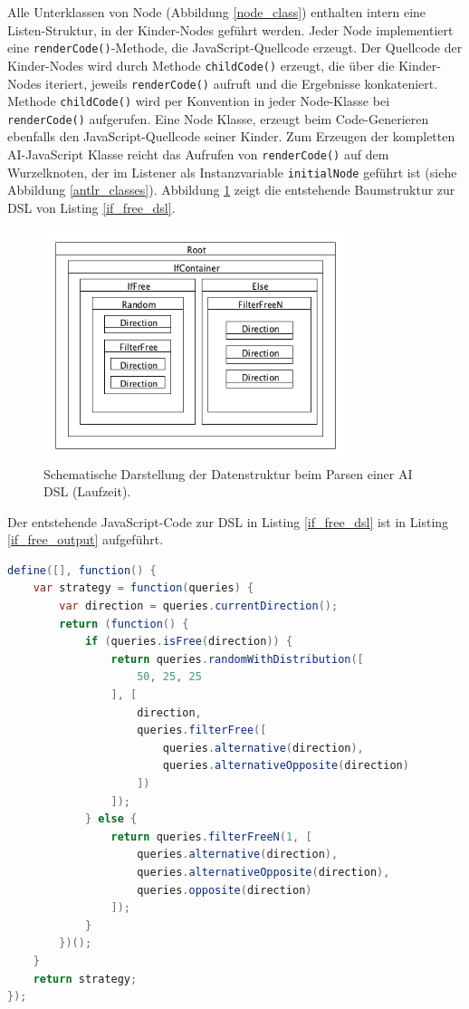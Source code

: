 \documentclass[conference]{IEEEtran}
\begin{document}
Alle Unterklassen von Node (Abbildung  \ref{node_class}) enthalten intern eine Listen-Struktur, in der Kinder-Nodes geführt werden. Jeder Node implementiert eine \texttt{renderCode()}-Methode, die JavaScript-Quellcode erzeugt. Der Quellcode der Kinder-Nodes wird durch Methode \texttt{childCode()} erzeugt, die über die Kinder-Nodes iteriert, jeweils \texttt{renderCode()} aufruft und die Ergebnisse konkateniert. Methode \texttt{childCode()} wird per Konvention in jeder Node-Klasse bei \texttt{renderCode()} aufgerufen. Eine Node Klasse, erzeugt beim Code-Generieren ebenfalls den JavaScript-Quellcode seiner Kinder. Zum Erzeugen der kompletten AI-JavaScript Klasse reicht das Aufrufen von \texttt{renderCode()} auf dem Wurzelknoten, der im Listener als Instanzvariable \texttt{initialNode} geführt ist (siehe Abbildung \ref{antlr_classes}). Abbildung \ref{node_structure_ex} zeigt die entstehende Baumstruktur zur DSL von Listing \ref{if_free_dsl}.


\begin{figure}[!htb]
\centering
\includegraphics[width=3.5in]{node_structure_ex.png}
\caption{Schematische Darstellung der Datenstruktur beim Parsen einer AI DSL (Laufzeit).}
\label{node_structure_ex}
\end{figure}

Der entstehende JavaScript-Code zur DSL in Listing \ref{if_free_dsl} ist in Listing \ref{if_free_output} aufgeführt.

\begin{lstlisting}[language=Java, captionpos=b, caption=Beispiel zu generiertem JavaScript-Code einer AI DSL, label=if_free_output]
 define([], function() {
    var strategy = function(queries) {
        var direction = queries.currentDirection();
        return (function() {
            if (queries.isFree(direction)) {
                return queries.randomWithDistribution([
                    50, 25, 25
                ], [
                    direction,
                    queries.filterFree([
                        queries.alternative(direction),
                        queries.alternativeOpposite(direction)
                    ])
                ]);
            } else {
                return queries.filterFreeN(1, [
                    queries.alternative(direction),
                    queries.alternativeOpposite(direction),
                    queries.opposite(direction)
                ]);
            }
        })();
    }
    return strategy;
});
\end{lstlisting}
\end{document}
